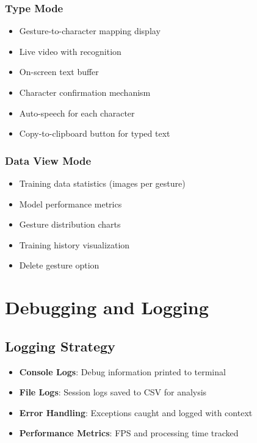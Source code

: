 \subsubsection{Type Mode}
\begin{itemize}
    \item Gesture-to-character mapping display
    \item Live video with recognition
    \item On-screen text buffer
    \item Character confirmation mechanism
    \item Auto-speech for each character
    \item Copy-to-clipboard button for typed text
\end{itemize}

\subsubsection{Data View Mode}
\begin{itemize}
    \item Training data statistics (images per gesture)
    \item Model performance metrics
    \item Gesture distribution charts
    \item Training history visualization
    \item Delete gesture option
\end{itemize}

\section{Debugging and Logging}

\subsection{Logging Strategy}

\begin{itemize}
    \item \textbf{Console Logs}: Debug information printed to terminal
    \item \textbf{File Logs}: Session logs saved to CSV for analysis
    \item \textbf{Error Handling}: Exceptions caught and logged with context
    \item \textbf{Performance Metrics}: FPS and processing time tracked
\end{itemize}

